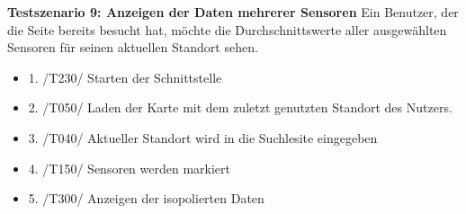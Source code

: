 \textbf{Testszenario 9: Anzeigen der Daten mehrerer Sensoren}
\newline
Ein Benutzer, der die Seite bereits besucht hat, möchte die Durchschnittswerte aller ausgewählten Sensoren für seinen aktuellen Standort sehen.
\begin{itemize} [noitemsep]
    \item 1. /T230/ Starten der Schnittstelle
    \item 2. /T050/ Laden der Karte mit dem zuletzt genutzten Standort des Nutzers.
    \item 3. /T040/ Aktueller Standort wird in die Suchlesite eingegeben
    \item 4. /T150/ Sensoren werden markiert
    \item 5. /T300/ Anzeigen der isopolierten Daten
\end{itemize}
